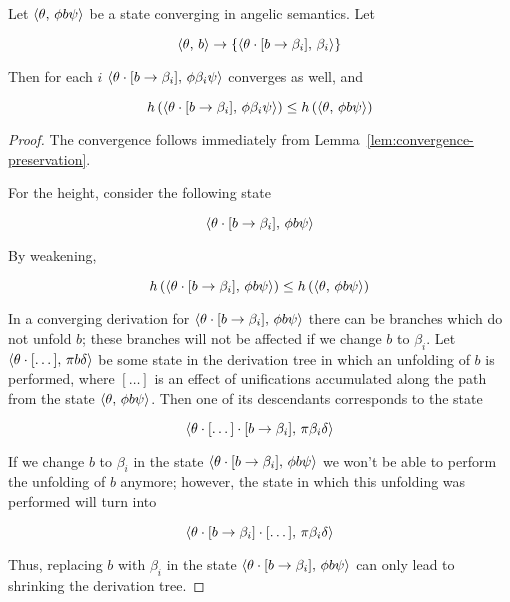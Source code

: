 
\begin{lemma}
  \label{lem:height-mono}
  Let $\langle \theta,\,\phi b \psi \rangle$ be a state converging in angelic semantics. Let
  
  \[
  \langle \theta,\,b \rangle\to\{\langle \theta\cdot[b\to\beta_i],\,\beta_i \rangle\}
  \]

  Then for each $i$ $\langle \theta\cdot[b\to\beta_i],\,\phi \beta_i \psi \rangle$ converges as well,
  and

  \[
  h\,(\langle \theta\cdot[b\to\beta_i],\,\phi \beta_i \psi \rangle)\le h\,(\langle \theta,\,\phi b \psi \rangle)
  \]  
\end{lemma}
\begin{proof}
  The convergence follows immediately from Lemma~\ref{lem:convergence-preservation}.
  
  For the height, consider the following state

  \[
   \langle \theta\cdot[b\to\beta_i],\,\phi b \psi \rangle
  \]

  By weakening,

  \[
  h\,(\langle \theta\cdot[b\to\beta_i],\,\phi b \psi \rangle)\le h\,( \langle \theta,\,\phi b \psi \rangle)
  \]

  In a converging derivation for $\langle \theta\cdot[b\to\beta_i],\,\phi b \psi \rangle$ there can be branches which do not unfold $b$; these
  branches will not be affected if we change $b$ to $\beta_i$. Let $\langle \theta\cdot[\dots],\,\pi b \delta \rangle$ be some state in the derivation
  tree in which an unfolding of $b$ is performed, where $[\dots]$ is an effect of unifications accumulated along the path from the state $\langle \theta,\,\phi b \psi \rangle$.
  Then one of its descendants corresponds to the state

  \[
  \langle \theta\cdot[\dots]\cdot[b\to\beta_i],\,\pi\beta_i\delta \rangle
  \]
  
  If we change $b$ to $\beta_i$ in the state $\langle \theta\cdot[b\to\beta_i],\,\phi b \psi \rangle$ we won't be able to perform the unfolding of $b$ anymore; however, the state in which this
  unfolding was performed will turn into

  \[
  \langle \theta\cdot[b\to\beta_i]\cdot[\dots],\,\pi\beta_i\delta \rangle
  \]

  Thus, replacing $b$ with $\beta_i$ in the state $\langle \theta\cdot[b\to\beta_i],\,\phi b \psi \rangle$ can only lead to shrinking the derivation tree.
\end{proof}

